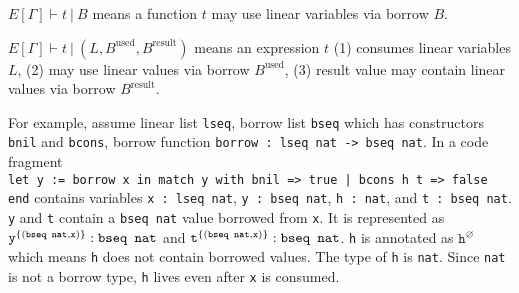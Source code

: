 \documentclass[a4paper,fleqn]{article}
\begin{document}
$E[\Gamma] \vdash t~|~B$ means a function $t$ may use linear variables via borrow $B$.

$E[\Gamma] \vdash t~|~(L, B^\text{used}, B^\text{result})$ means an expression $t$
(1) consumes linear variables $L$,
(2) may use linear values via borrow $B^\text{used}$,
(3) result value may contain linear values via borrow $B^\text{result}$.

For example, assume linear list \lstinline!lseq!, borrow list \lstinline!bseq! which has constructors \lstinline!bnil! and \lstinline!bcons!,
borrow function \lstinline!borrow : lseq nat -> bseq nat!.
In a code fragment \\
\lstinline!let y := borrow x in match y with bnil => true | bcons h t => false end! contains variables
\lstinline!x : lseq nat!,
\lstinline!y : bseq nat!,
\lstinline!h : nat!, and
\lstinline!t : bseq nat!.
\texttt{y} and \texttt{t} contain a \texttt{bseq nat} value borrowed from \texttt{x}.
It is represented as
$\texttt{y}^{\{(\texttt{bseq nat},\texttt{x})\}}:\text{\texttt{bseq nat}}$ and
$\texttt{t}^{\{(\texttt{bseq nat},\texttt{x})\}}:\text{\texttt{bseq nat}}$.
\texttt{h} is annotated as $\texttt{h}^\varnothing$ which means \texttt{h} does not contain borrowed values.
The type of \texttt{h} is \texttt{nat}.
Since \texttt{nat} is not a borrow type, \texttt{h} lives even after \texttt{x} is consumed.
\end{document}

